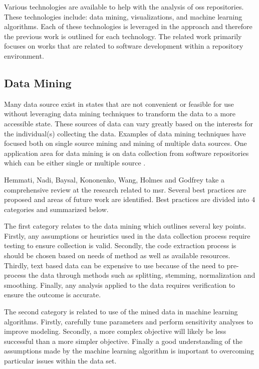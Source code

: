 Various technologies are available to help with the analysis of \gls{oss} repositories. These technologies include: data mining, visualizations, and machine learning algorithms. Each of these technologies is leveraged in the approach and therefore the previous work is outlined for each technology. The related work primarily focuses on works that are related to software development within a repository environment.

\subsection{Data Mining}

Many data source exist in states that are not convenient or feasible for use without leveraging data mining techniques to transform the data to a more accessible state. These sources of data can vary greatly based on the interests for the individual(s) collecting the data. Examples of data mining techniques have focused both on single source mining and mining of multiple data sources. One application area for data mining is on data collection from software repositories which can be either single or multiple source \cite{Dit2013, Hassan2006, Hemmati2013, Kagdi2007, Maletic2004, Zimmermann2005a}.

Hemmati, Nadi, Baysal, Kononenko, Wang, Holmes and Godfrey take a comprehensive review at the research related to \gls{msr}\cite{Hemmati2013}. Several best practices are proposed and areas of future work are identified. Best practices are divided into 4 categories and summarized below.

The first category relates to the data mining which outlines several key points. Firstly, any assumptions or heuristics used in the data collection process require testing to ensure collection is valid. Secondly, the code extraction process is should be chosen based on needs of method as well as available resources. Thirdly, text based data can be expensive to use because of the need to pre-process the data through methods such as splitting, stemming, normalization and smoothing. Finally, any analysis applied to the data requires verification to ensure the outcome is accurate.

The second category is related to use of the mined data in machine learning algorithms. Firstly, carefully tune parameters and perform sensitivity analyses to improve modeling. Secondly, a more complex objective will likely be less successful than a more simpler objective. Finally a good understanding of the assumptions made by the machine learning algorithm is important to overcoming particular issues within the data set.

